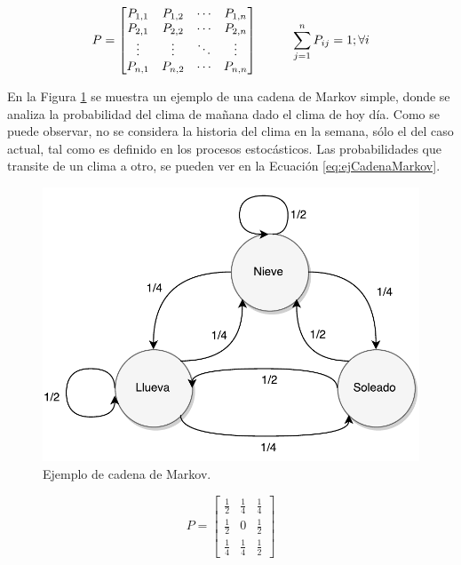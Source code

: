\begin{equation} \label{eq:matrizTransicion}
	P =
	\begin{bmatrix}
		P_{1,1} & P_{1,2} & \cdots & P_{1,n} \\
		P_{2,1} & P_{2,2} & \cdots & P_{2,n} \\
		\vdots  & \vdots  & \ddots & \vdots  \\
		P_{n,1} & P_{n,2} & \cdots & P_{n,n} \\
	\end{bmatrix}
	\hspace*{1cm} \sum_{j=1}^{n} P_{ij} = 1 ; \forall i
\end{equation}

En la Figura \ref{fig:ejCadenaMarkov} se muestra un ejemplo de una cadena de Markov simple, donde se analiza la probabilidad del clima de mañana dado el clima de hoy día. Como se puede observar, no se considera la historia del clima en la semana, sólo el del caso actual, tal como es definido en los procesos estocásticos. Las probabilidades que transite de un clima a otro, se pueden ver en la Ecuación \ref{eq:ejCadenaMarkov}.

\begin{figure}[ht!]
	\centering
	\includegraphics[scale=0.5]{images/EjCadenaMarkov.pdf}
	\caption{Ejemplo de cadena de Markov.}
	\label{fig:ejCadenaMarkov}
\end{figure}

\begin{equation} \label{eq:ejCadenaMarkov}
	P =
	\begin{bmatrix}
		\frac{1}{2} & \frac{1}{4} & \frac{1}{4} \\
		\frac{1}{2} & 0 & \frac{1}{2} \\
		\frac{1}{4} & \frac{1}{4} & \frac{1}{2}
	\end{bmatrix}	
\end{equation}

